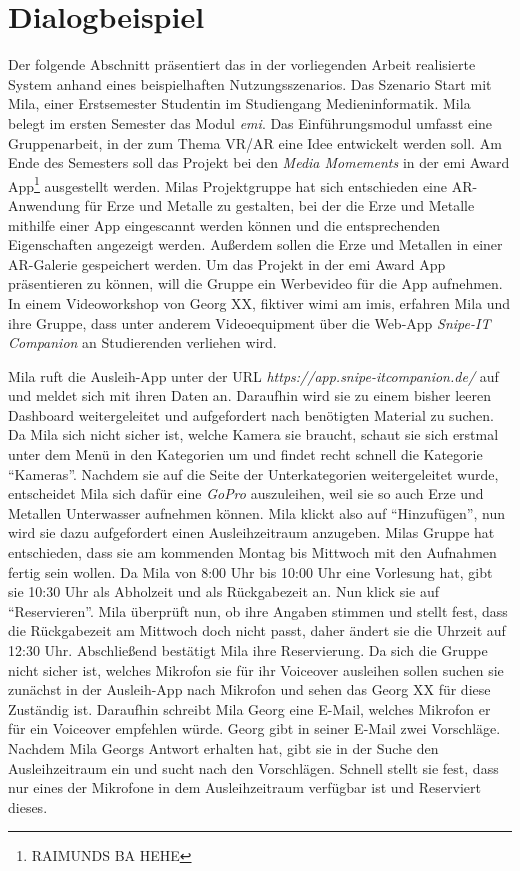 \chapter{Dialogbeispiel}
\label{chapter-dialogbeispiel}

Der folgende Abschnitt präsentiert das in der vorliegenden Arbeit realisierte System anhand eines
beispielhaften Nutzungsszenarios. Das Szenario Start mit Mila, einer Erstsemester Studentin im Studiengang
Medieninformatik. Mila belegt im ersten Semester das Modul \textit{\ac{emi}}. Das Einführungsmodul
umfasst eine Gruppenarbeit, in der zum Thema VR/AR eine Idee entwickelt werden soll. Am Ende des
Semesters soll das Projekt bei den \textit{Media Momements} in der \ac{emi} Award
App\footnote{RAIMUNDS BA HEHE} ausgestellt werden. Milas Projektgruppe hat sich entschieden eine
AR-Anwendung für Erze und Metalle zu gestalten, bei der die Erze und Metalle mithilfe einer App
eingescannt werden können und die entsprechenden Eigenschaften angezeigt werden. Außerdem sollen die
Erze und Metallen in einer AR-Galerie gespeichert werden. Um das Projekt in der \ac{emi}
Award App präsentieren zu können, will die Gruppe ein Werbevideo für die App aufnehmen. In einem
Videoworkshop von Georg XX, fiktiver \ac{wimi} am \ac{imis}, erfahren Mila und ihre Gruppe, dass
unter anderem Videoequipment über die Web-App \textit{Snipe-IT Companion} an Studierenden verliehen
wird. 

Mila ruft die Ausleih-App unter der URL \textit{https://app.snipe-itcompanion.de/} auf und meldet
sich mit ihren  Daten an. Daraufhin wird sie zu einem bisher leeren Dashboard weitergeleitet und
aufgefordert nach benötigten Material zu suchen. Da Mila sich nicht sicher ist, welche Kamera sie
braucht, schaut sie sich erstmal unter dem Menü in den Kategorien um und findet recht schnell die
Kategorie \enquote{Kameras}. Nachdem sie auf die Seite der Unterkategorien weitergeleitet wurde,
entscheidet Mila sich dafür eine \textit{GoPro} auszuleihen, weil sie so auch Erze und Metallen
Unterwasser aufnehmen können. Mila klickt also auf \enquote{Hinzufügen}, nun wird sie dazu
aufgefordert einen Ausleihzeitraum anzugeben. Milas Gruppe hat entschieden, dass sie am kommenden
Montag bis Mittwoch mit den Aufnahmen fertig sein wollen. Da Mila von 8:00 Uhr bis 10:00 Uhr eine
Vorlesung hat, gibt sie 10:30 Uhr als Abholzeit und als Rückgabezeit an. Nun klick sie auf
\enquote{Reservieren}. Mila überprüft nun, ob ihre Angaben stimmen und stellt fest, dass die
Rückgabezeit am Mittwoch doch nicht passt, daher ändert sie die Uhrzeit auf 12:30 Uhr. Abschließend
bestätigt Mila ihre Reservierung. Da sich die Gruppe nicht sicher ist, welches Mikrofon sie für ihr
Voiceover ausleihen sollen suchen sie zunächst in der Ausleih-App nach Mikrofon und sehen das Georg
XX für diese Zuständig ist. Daraufhin schreibt Mila Georg eine E-Mail, welches Mikrofon er für ein
Voiceover empfehlen würde. Georg gibt in seiner E-Mail zwei Vorschläge. Nachdem Mila Georgs Antwort
erhalten hat, gibt sie in der Suche den Ausleihzeitraum ein und sucht nach den Vorschlägen. Schnell
stellt sie fest, dass nur eines der Mikrofone in dem Ausleihzeitraum verfügbar ist und Reserviert
dieses. 


